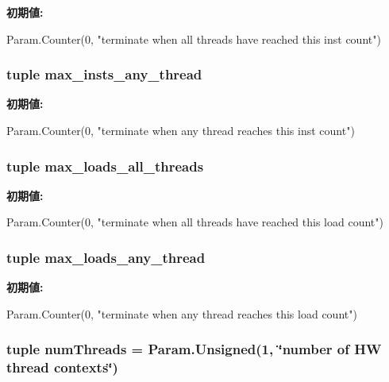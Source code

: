 \label{classBaseCPU_a5baeef1affeb41d3e04f0d3450d48f0c}
{\bfseries 初期値:}
\begin{DoxyCode}
Param.Counter(0,
        "terminate when all threads have reached this inst count")
\end{DoxyCode}
\hypertarget{classBaseCPU_afa4e8faf201b5d5e4da394405ee84805}{
\subsubsection[{max\_\-insts\_\-any\_\-thread}]{\setlength{\rightskip}{0pt plus 5cm}tuple {\bf max\_\-insts\_\-any\_\-thread}}}
\label{classBaseCPU_afa4e8faf201b5d5e4da394405ee84805}
{\bfseries 初期値:}
\begin{DoxyCode}
Param.Counter(0,
        "terminate when any thread reaches this inst count")
\end{DoxyCode}
\hypertarget{classBaseCPU_a1ae95047fbaf997fcce9b1fce56e33c8}{
\subsubsection[{max\_\-loads\_\-all\_\-threads}]{\setlength{\rightskip}{0pt plus 5cm}tuple {\bf max\_\-loads\_\-all\_\-threads}}}
\label{classBaseCPU_a1ae95047fbaf997fcce9b1fce56e33c8}
{\bfseries 初期値:}
\begin{DoxyCode}
Param.Counter(0,
        "terminate when all threads have reached this load count")
\end{DoxyCode}
\hypertarget{classBaseCPU_af0e664a8b890f123dd471b9d8f16aa69}{
\subsubsection[{max\_\-loads\_\-any\_\-thread}]{\setlength{\rightskip}{0pt plus 5cm}tuple {\bf max\_\-loads\_\-any\_\-thread}}}
\label{classBaseCPU_af0e664a8b890f123dd471b9d8f16aa69}
{\bfseries 初期値:}
\begin{DoxyCode}
Param.Counter(0,
        "terminate when any thread reaches this load count")
\end{DoxyCode}
\hypertarget{classBaseCPU_aac03a586f9fcb28bcbe8c3721888fa93}{
\subsubsection[{numThreads}]{\setlength{\rightskip}{0pt plus 5cm}tuple {\bf numThreads} = Param.Unsigned(1, \char`\"{}number of HW thread contexts\char`\"{})}}
\label{classBaseCPU_aac03a586f9fcb28bcbe8c3721888fa93}


